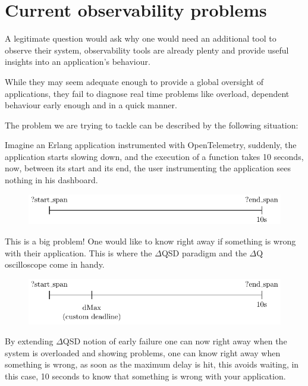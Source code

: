 \section{Current observability problems}

    A legitimate question would ask why one would need an additional tool to observe their system, observability tools are already plenty and provide useful insights into an application's behaviour.
    
    While they may seem adequate enough to provide a global oversight of applications, they fail to diagnose real time problems like overload, dependent behaviour early enough and in a quick manner. 
    
    The problem we are trying to tackle can be described by the following situation: 

Imagine an Erlang application instrumented with OpenTelemetry, suddenly, the application starts slowing down, and the execution of a function takes 10 seconds, now, between its start and its end, the user instrumenting the application sees nothing in his dashboard.
    \begin{figure}[H]
        \begin{center}
            \includegraphics{tikz/start_end.pdf}
        \end{center}
    \end{figure}
    This is a big problem! One would like to know right away if something is wrong with their application. This is where the $\Delta$QSD paradigm and the $\Delta$Q oscilloscope come in handy.
    \begin{figure}[H]
        \begin{center}
            \includegraphics{tikz/start_end_dmax.pdf}
        \end{center}
    \end{figure} 
    By extending $\Delta$QSD notion of early failure one can now right away when the system is overloaded and showing problems, one can know right away when something is wrong, as soon as the maximum delay is hit, this avoids waiting, in this case, 10 seconds to know that something is wrong with your application. \label{timeout}


